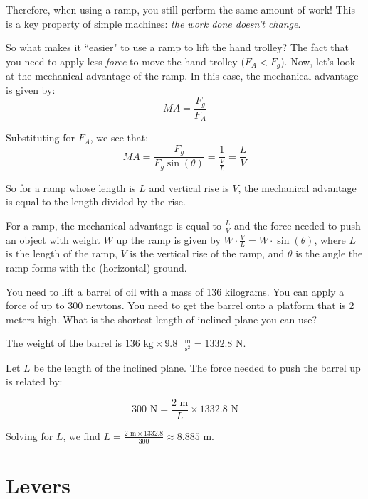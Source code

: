 Therefore, when using a ramp, you still perform the same amount of work! This 
is a key property of simple machines: \textit{the work done doesn't change}.

So what makes it ``easier" to use a ramp to lift the hand trolley? The fact 
that you need to apply less \textit{force} to move the hand trolley ($F_A < 
F_g$). Now, let's look at the mechanical advantage of the ramp. In this case, 
the mechanical advantage is given by:
$$MA = \frac{F_g}{F_A}$$

Substituting for $F_A$, we see that:
$$MA = \frac{F_g}{F_g \sin{ \left( \theta \right)}} = \frac{1}{\frac{V}{L}} 
= \frac{L}{V}$$

So for a ramp whose length is $L$ and vertical rise is $V$, the mechanical 
advantage is equal to the length divided by the rise. 

\begin{mdframed}[style = important, frametitle={Ramps}]
For a ramp, the mechanical advantage is equal to $\frac{L}{V}$ and the force 
needed to push an object with weight $W$ up the ramp is given by $W \cdot 
\frac{V}{L} = W \cdot \sin{ \left( \theta \right)}$, where $L$ is the length 
of the ramp, $V$ is the vertical rise of the ramp, and $\theta$ is the angle 
the ramp forms with the (horizontal) ground.
\end{mdframed}

\begin{Exercise}[title={Ramp}, label=ramp]
You need to lift a barrel of oil with a mass of 136 kilograms. You can apply a 
force of up to 300 newtons. You need to get the barrel onto a platform that is 
2 meters high. What is the shortest length of inclined plane you can use?
\end{Exercise}
\begin{Answer}[ref=ramp]
The weight of the barrel is \( 136 \text{ kg} \times 9.8 \text{ } 
\frac{\text{m}}{\text{s}^2}= 1332.8 \text{ N}\).

Let \( L \) be the length of the inclined plane. The force needed to push the 
barrel up is related by:

\[
300 \text{ N}= \frac{2 \text{ m}}{L} \times 1332.8 \text{ N}
\]

Solving for \( L \), we find \( L = \frac{2 \text{ m} \times 1332.8}{300} 
\approx 8.885 \text{ m}\).
\end{Answer}

\section{Levers}

